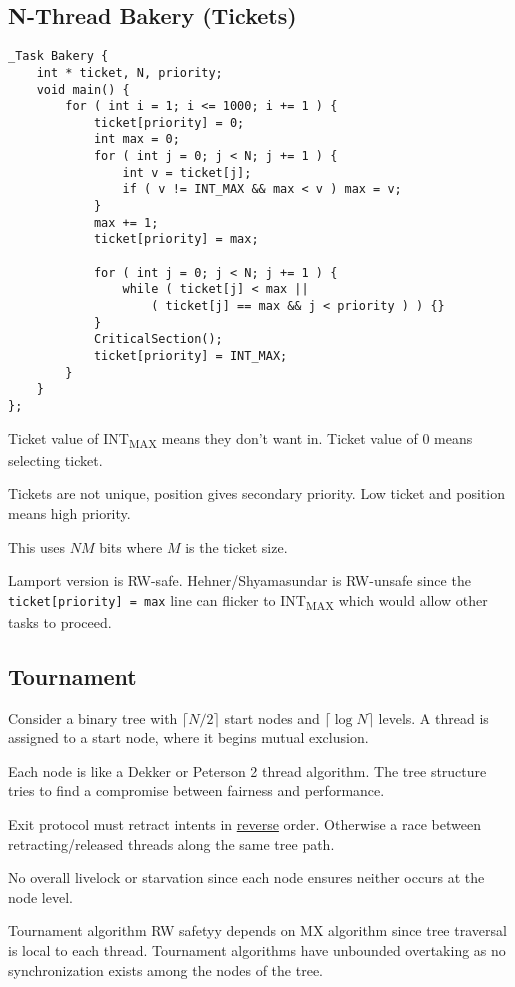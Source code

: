 \documentclass[11pt]{article}
\begin{document}
\subsection{N-Thread Bakery (Tickets)}
\label{sec:org15a67c1}
\begin{verbatim}
_Task Bakery {
    int * ticket, N, priority;
    void main() {
        for ( int i = 1; i <= 1000; i += 1 ) {
            ticket[priority] = 0;
            int max = 0;
            for ( int j = 0; j < N; j += 1 ) {
                int v = ticket[j];
                if ( v != INT_MAX && max < v ) max = v;
            }
            max += 1;
            ticket[priority] = max;

            for ( int j = 0; j < N; j += 1 ) {
                while ( ticket[j] < max ||
                    ( ticket[j] == max && j < priority ) ) {}
            }
            CriticalSection();
            ticket[priority] = INT_MAX;
        }
    }
};
\end{verbatim}

Ticket value of INT\textsubscript{MAX} means they don't want in.
Ticket value of 0 means selecting ticket.

Tickets are not unique, position gives secondary priority.
Low ticket and position means high priority.

This uses \(NM\) bits where \(M\) is the ticket size.

Lamport version is RW-safe.
Hehner/Shyamasundar is RW-unsafe since the \texttt{ticket[priority] = max} line
can flicker to INT\textsubscript{MAX} which would allow other tasks to proceed.
\subsection{Tournament}
\label{sec:org06dcdf7}
Consider a binary tree with \(\lceil N/2 \rceil\) start nodes and \(\lceil \log N \rceil\) levels.
A thread is assigned to a start node, where it begins mutual exclusion.

Each node is like a Dekker or Peterson 2 thread algorithm.
The tree structure tries to find a compromise between fairness and performance.

Exit protocol must retract intents in \uline{reverse} order.
Otherwise a race between retracting/released threads along the same tree path.

No overall livelock or starvation since each node ensures neither occurs at the node level.

Tournament algorithm RW safetyy depends on MX algorithm since tree traversal is local to each
thread.
Tournament algorithms have unbounded overtaking as no synchronization exists among the nodes
of the tree.
\end{document}
